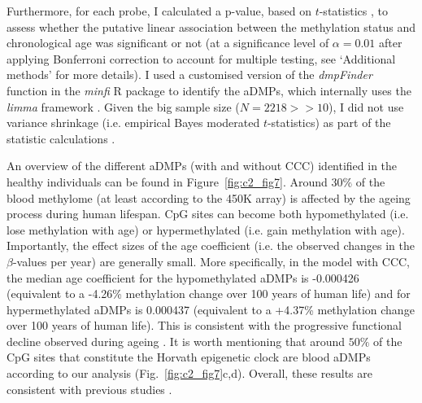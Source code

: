 Furthermore, for each probe, I calculated a p-value, based on $t$-statistics \cite{Teschendorff2018}, to assess whether the putative linear association between the methylation status and chronological age was significant or not (at a significance level of $\alpha=0.01$ after applying Bonferroni correction to account for multiple testing, see `Additional methods' for more details). I used a customised version of the \textit{dmpFinder} function in the \textit{minfi} R package \cite{Aryee2014} to identify the aDMPs, which internally uses the \textit{limma} framework \cite{Ritchie2015}. Given the big sample size ($N = 2218 >>10$), I did not use variance shrinkage (i.e. empirical Bayes moderated $t$-statistics) as part of the statistic calculations \cite{Ritchie2015}.  

\bigskip

An overview of the different aDMPs (with and without CCC) identified in the healthy individuals can be found in Figure~\ref{fig:c2_fig7}. Around $30\%$ of the blood methylome (at least according to the 450K array) is affected by the ageing process during human lifespan. CpG sites can become both hypomethylated (i.e. lose methylation with age) or hypermethylated (i.e. gain methylation with age). Importantly, the effect sizes of the age coefficient (i.e. the observed changes in the $\beta$-values per year) are generally small. More specifically, in the model with CCC, the median age coefficient for the hypomethylated aDMPs is -0.000426 (equivalent to a -4.26\% methylation change over 100 years of human life) and for hypermethylated aDMPs is 0.000437 (equivalent to a +4.37\% methylation change over 100 years of human life). This is consistent with the progressive functional decline observed during ageing \cite{Lopez-Otin2013}. It is worth mentioning that around $50\%$ of the CpG sites that constitute the Horvath epigenetic clock are blood aDMPs according to our analysis (Fig.~\ref{fig:c2_fig7}c,d). Overall, these results are consistent with previous studies \cite{Slieker2016,Slieker2018,Zhu2018,VanDongen2016}.

